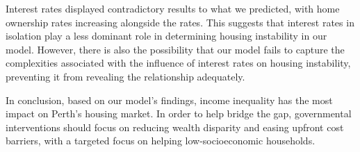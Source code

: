 \documentclass[11pt]{article}
\begin{document}
Interest rates displayed contradictory results to what we predicted, with home ownership rates
increasing alongside the rates. This suggests that interest rates in isolation play a less dominant role in determining
housing instability in our model. However, there is also the possibility that our model
fails to capture the complexities associated with the influence of interest rates on housing instability,
preventing it from revealing the relationship adequately.

In conclusion, based on our model's findings, income inequality has the most impact on Perth's housing
market. In order to help bridge the gap, governmental interventions should focus on reducing 
wealth disparity and easing upfront cost barriers, with a targeted focus on helping 
low-socioeconomic households. 




\end{document}
